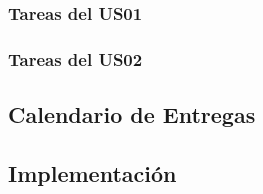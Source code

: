   \subsubsection{Tareas del US01}
  \label{sub:us01_tasks}

    

  \subsubsection{Tareas del US02}
  \label{sub:us02_tasks}

    


  \subsection{Calendario de Entregas}
  \label{subs:schedule_1}

    


\subsection{Implementación}
\label{sub:implementacion_iteracion_1}

    

%

